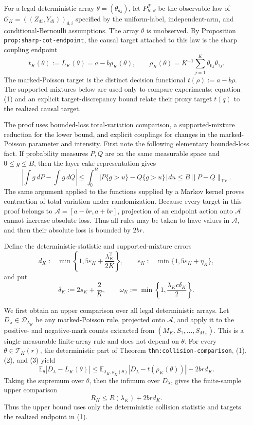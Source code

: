 For a legal deterministic array \(\theta=(\theta_{dj})\), let \(P^{\mathcal F}_{K,\theta}\) be the observable law of \(\mathcal O_K=((Z_{di},Y_{di}))_{d,i}\) specified by the uniform-label, independent-arm, and conditional-Bernoulli assumptions.  The array \(\theta\) is unobserved.  By Proposition \texttt{prop:sharp-cot-endpoint}, the causal target attached to this law is the sharp coupling endpoint
\[
 t_K(\theta):=L_K(\theta)=a-b\rho_K(\theta),
 \qquad
 \rho_K(\theta)=K^{-1}\sum_{j=1}^K\theta_{0j}\theta_{1j}.
 \tag{1}
\]
The marked-Poisson target is the distinct decision functional \(t(\rho):=a-b\rho\).  The supported mixtures below are used only to compare experiments; equation (1) and an explicit target-discrepancy bound relate their proxy target \(t(q)\) to the realized causal target.

The proof uses bounded-loss total-variation comparison, a supported-mixture reduction for the lower bound, and explicit couplings for changes in the marked-Poisson parameter and intensity.  First note the following elementary bounded-loss fact.  If probability measures \(P,Q\) are on the same measurable space and \(0\le g\le B\), then the layer-cake representation gives
\[
 \left|\int g\,dP-\int g\,dQ\right|
 \le \int_0^B\left|P\{g>u\}-Q\{g>u\}\right|\,du
 \le B\lVert P-Q\rVert_{\mathrm{TV}}.
 \tag{2}
\]
The same argument applied to the functions supplied by a Markov kernel proves contraction of total variation under randomization.  Because every target in this proof belongs to \(\mathcal A=[a-br,a+br]\), projection of an endpoint action onto \(\mathcal A\) cannot increase absolute loss.  Thus all rules may be taken to have values in \(\mathcal A\), and then their absolute loss is bounded by \(2br\).

Define the deterministic-statistic and supported-mixture errors
\[
 d_K:=\min\left\{1,5\varepsilon_K+\frac{\lambda_K^2}{2K}\right\},
 \qquad
 e_K:=\min\{1,5\varepsilon_K+\eta_K\},
 \tag{3}
\]
and put
\[
 \delta_K:=2s_K+\frac2K,
 \qquad
 \omega_K:=\min\left\{1,\frac{\lambda_Kc\delta_K}{2}\right\}.
 \tag{4}
\]

We first obtain an upper comparison over all legal deterministic arrays.  Let \(D_\lambda\in\mathscr D_{\lambda_K}\) be any marked-Poisson rule, projected onto \(\mathcal A\), and apply it to the positive- and negative-mark counts extracted from \((M_K,S_1,\ldots,S_{M_K})\).  This is a single measurable finite-array rule and does not depend on \(\theta\).  For every \(\theta\in\mathcal T_K(r)\), the deterministic part of Theorem \texttt{thm:collision-comparison}, (1), (2), and (3) yield
\[
 \mathbb E_\theta\left|D_\lambda-L_K(\theta)\right|
 \le
 \mathbb E_{\lambda_K,\rho_K(\theta)}
 \left|D_\lambda-t(\rho_K(\theta))\right|+2brd_K.
 \tag{5}
\]
Taking the supremum over \(\theta\), then the infimum over \(D_\lambda\), gives the finite-sample upper comparison
\[
 R_K\le R(\lambda_K)+2brd_K.
 \tag{6}
\]
Thus the upper bound uses only the deterministic collision statistic and targets the realized endpoint in (1).

